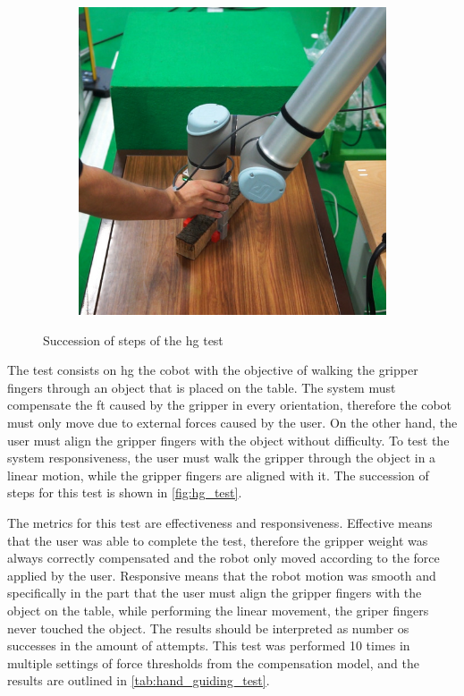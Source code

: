 \begin{figure}[h]
\begin{subfigure}{.2\linewidth}
    \end{subfigure}%
    \begin{subfigure}{.2\linewidth}
        \centering
        \includegraphics[width=.95\linewidth]{figs/chp6/hg_test_4.jpg}
    \end{subfigure}
    \caption{Succession of steps of the \ac{hg} test}
    \label{fig:hg_test}
\end{figure}

\par The test consists on  \ac{hg} the cobot with the objective of walking the gripper fingers through an object that is placed on the table. The system must compensate the \ac{ft} caused by the gripper in every orientation, therefore the cobot must only move due to external forces caused by the user. On the other hand, the user must align the gripper fingers with the object without difficulty. To test the system responsiveness, the user must walk the gripper through the object in a linear motion, while the gripper fingers are aligned with it. The succession of steps for this test is shown in \autoref{fig:hg_test}. 

\par The metrics for this test are effectiveness and responsiveness. Effective means that the user was able to complete the test, therefore the gripper weight was always correctly compensated and the robot only moved according to the force applied by the user. Responsive means that the robot motion was smooth and specifically in the part that the user must align the gripper fingers with the object on the table, while performing the linear movement, the griper fingers never touched the object. The results should be interpreted as number os successes in the amount of attempts. This test was performed 10 times in multiple settings of force thresholds from the compensation model, and the results are outlined in \autoref{tab:hand_guiding_test}. 

